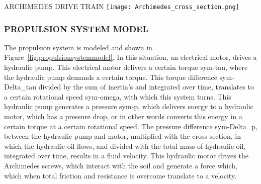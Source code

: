 \begin{RoyalFigure}[!htb, label=fig:archimedes_drive_train]{ARCHIMEDES DRIVE TRAIN}
	\texttt{[image: Archimedes\_cross\_section.png]}
\end{RoyalFigure}

\subsubsection{PROPULSION SYSTEM MODEL}

The propulsion system is modeled and shown in Figure~\ref{fig:propulsionsystemmodel}. In this situation, an
electrical motor, drives a hydraulic pump. This electrical motor delivers a certain torque \gls{sym-tau}, where the
hydraulic pump demands a certain torque. This torque difference \gls{sym-Delta_tau} divided by the sum of inertia's and
integrated over time, translates to a certain rotational speed \gls{sym-omega}, with which this system turns. This
hydraulic pump generates a pressure \gls{sym-p}, which delivers energy to a hydraulic motor, which has a pressure drop,
or in other words converts this energy in a certain torque at a certain rotational speed. The pressure difference
\gls{sym-Delta_p}, between the hydraulic pump and motor, multiplied with the cross section, in which the hydraulic oil
flows, and divided with the total mass of hydraulic oil, integrated over time, results in a fluid velocity. This
hydraulic motor drives the Archimedes screws, which interact with the soil and generate a force which, which when total
friction and resistance is overcome translate to a velocity.

